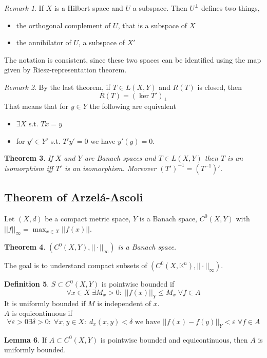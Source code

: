 \documentclass[a4paper, 12pt]{article}
\theoremstyle{plain}
\newtheorem{theorem}{Theorem}[subsection] %
\theoremstyle{definition}
\newtheorem{definition}[theorem]{Definition} %
\theoremstyle{lemma}
\newtheorem{lemma}[theorem]{Lemma}
\theoremstyle{remark}
\newtheorem{remark}[theorem]{Remark}
\theoremstyle{corollary}
\theoremstyle{example}
\begin{document}
	\begin{remark}
		If $X$ is a Hilbert space and $U$ a subspace. Then $U^\bot$ defines two things, \begin{itemize}
			\item the orthogonal complement of $U$, that is a subspace of $X$
			\item the annihilator of $U$, a subspace of $X'$
		\end{itemize}
		The notation is consistent, since these two spaces can be identified using the map given by Riesz-representation theorem.
	\end{remark}
	\begin{remark}
		By the last theorem, if $T\in L(X,Y)$ and $R(T)$ is closed, then \[R(T) = (\ker T')_\bot\]
		That means that for $y\in Y$ the following are equivalent \begin{itemize}
			\item $\exists X$ s.t. $Tx = y$
			\item for $y'\in Y'$ s.t. $T'y' = 0$ we have $y'(y) = 0$.
		\end{itemize}
	\end{remark}
	\begin{theorem}
		If $X$ and $Y$ are Banach spaces and $T \in L(X,Y)$ then $T$ is an isomorphism iff $T'$ is an isomorphism. Moreover $(T')^{-1} = (T^{-1})'$.
	\end{theorem}
	\subsection{Theorem of Arzelá-Ascoli}
	Let $(X,d)$ be a compact metric space, $Y$ is a Banach space, $C^0(X,Y)$ with $||f||_\infty = \max_{x\in X} ||f(x)||$.
	\begin{theorem}
		$(C^0(X,Y),||\cdot ||_\infty)$ is a Banach space.
	\end{theorem}
	The goal is to understand compact subsets of $(C^0(X,\mathbb{K}^n),||\cdot ||_\infty)$. 
	\begin{definition}
		$S\subset C^0(X,Y)$ is pointwise bounded if \[\forall x \in X \; \exists M_x > 0: \; ||f(x)||_Y \leq M_x \; \forall f \in A\]
		It is uniformly bounded if $M$ is independent of $x$.\\
		$A$ is equicontinuous if \[\forall \varepsilon > 0 \exists \delta > 0: \; \forall x,y \in X: \; d_x(x,y) < \delta \text{ we have } ||f(x)-f(y)||_Y < \varepsilon \; \forall f \in A\]
	\end{definition}
	\begin{lemma}
		If $A \subset C^0(X,Y)$ is pointwise bounded and equicontinuous, then $A$ is uniformly bounded.
	\end{lemma}
\end{document}
